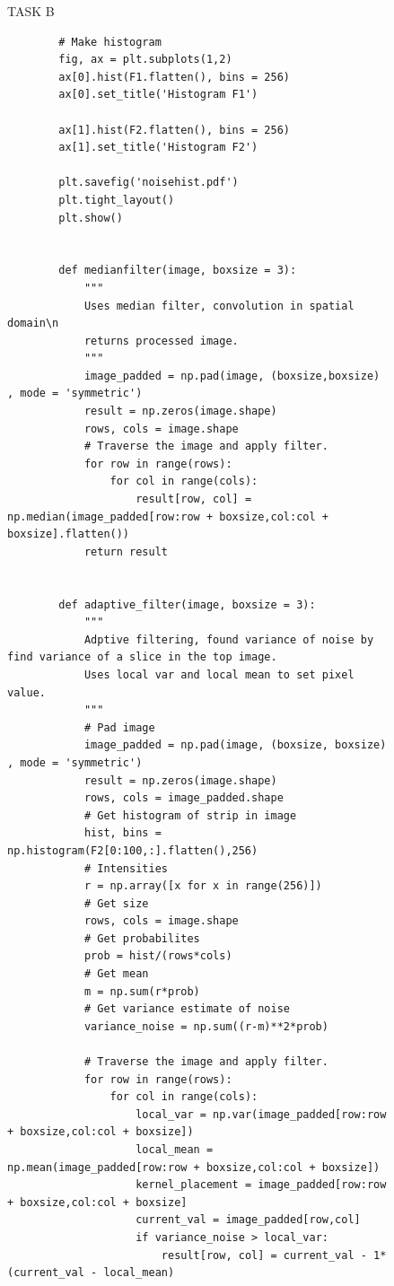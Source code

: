 {\begin{figure}[H]
\begin{lstlisting}
    \end{lstlisting}
\caption{TASK B}
\label{TASK B}
\end{figure}





\begin{figure}[H]
    \begin{lstlisting}
        # Make histogram
        fig, ax = plt.subplots(1,2)
        ax[0].hist(F1.flatten(), bins = 256)
        ax[0].set_title('Histogram F1')
        
        ax[1].hist(F2.flatten(), bins = 256)
        ax[1].set_title('Histogram F2')
        
        plt.savefig('noisehist.pdf')
        plt.tight_layout()
        plt.show()


        def medianfilter(image, boxsize = 3):
            """
            Uses median filter, convolution in spatial domain\n
            returns processed image.
            """
            image_padded = np.pad(image, (boxsize,boxsize) , mode = 'symmetric')
            result = np.zeros(image.shape)
            rows, cols = image.shape
            # Traverse the image and apply filter.
            for row in range(rows):
                for col in range(cols):
                    result[row, col] = np.median(image_padded[row:row + boxsize,col:col + boxsize].flatten())
            return result


        def adaptive_filter(image, boxsize = 3):
            """
            Adptive filtering, found variance of noise by find variance of a slice in the top image.
            Uses local var and local mean to set pixel value.
            """
            # Pad image
            image_padded = np.pad(image, (boxsize, boxsize) , mode = 'symmetric')
            result = np.zeros(image.shape)
            rows, cols = image_padded.shape
            # Get histogram of strip in image
            hist, bins = np.histogram(F2[0:100,:].flatten(),256)
            # Intensities
            r = np.array([x for x in range(256)])
            # Get size
            rows, cols = image.shape
            # Get probabilites
            prob = hist/(rows*cols)
            # Get mean
            m = np.sum(r*prob)
            # Get variance estimate of noise
            variance_noise = np.sum((r-m)**2*prob)
            
            # Traverse the image and apply filter.
            for row in range(rows):
                for col in range(cols):
                    local_var = np.var(image_padded[row:row + boxsize,col:col + boxsize])
                    local_mean = np.mean(image_padded[row:row + boxsize,col:col + boxsize])
                    kernel_placement = image_padded[row:row + boxsize,col:col + boxsize] 
                    current_val = image_padded[row,col]
                    if variance_noise > local_var:
                        result[row, col] = current_val - 1*(current_val - local_mean)
                    

\end{lstlisting}
\end{figure}}
